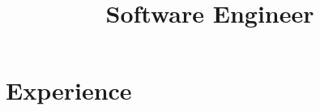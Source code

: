 \documentclass[11pt,a4paper,sans]{moderncv}        %
\title{Software Engineer}                               %
\begin{document}
\makecvtitle



\section{Experience}
\end{document}
